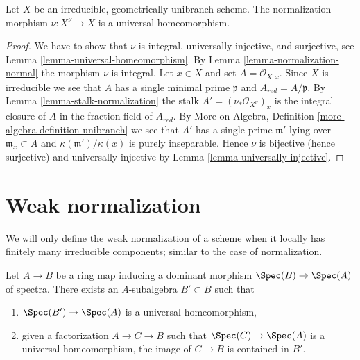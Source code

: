 \begin{lemma}
\label{lemma-normalization-geom-unibranch-univ-homeo}
Let $X$ be an irreducible, geometrically unibranch scheme.
The normalization morphism $\nu : X^\nu \to X$ is a universal
homeomorphism.
\end{lemma}

\begin{proof}
We have to show that $\nu$ is integral, universally injective,
and surjective, see Lemma \ref{lemma-universal-homeomorphism}.
By Lemma \ref{lemma-normalization-normal} the morphism $\nu$
is integral. Let $x \in X$ and set $A = \mathcal{O}_{X, x}$.
Since $X$ is irreducible we see that $A$ has a single
minimal prime $\mathfrak p$ and $A_{red} = A/\mathfrak p$.
By Lemma \ref{lemma-stalk-normalization} the stalk
$A' = (\nu_*\mathcal{O}_{X^\nu})_x$ is the integral closure of
$A$ in the fraction field of $A_{red}$. By
More on Algebra, Definition \ref{more-algebra-definition-unibranch}
we see that $A'$ has a single prime $\mathfrak m'$ lying
over $\mathfrak m_x \subset A$ and $\kappa(\mathfrak m')/\kappa(x)$
is purely inseparable. Hence $\nu$ is bijective (hence surjective)
and universally injective by Lemma \ref{lemma-universally-injective}.
\end{proof}







\section{Weak normalization}
\label{section-weak-normalization}

\noindent
We will only define the weak normalization of a scheme when
it locally has finitely many irreducible components; similar
to the case of normalization.

\begin{lemma}
\label{lemma-relative-weak-normalization-algebra}
Let $A \to B$ be a ring map inducing a dominant morphism
$\Spec(B) \to \Spec(A)$ of spectra. There exists an $A$-subalgebra
$B' \subset B$ such that
\begin{enumerate}
\item $\Spec(B') \to \Spec(A)$ is a universal homeomorphism,
\item given a factorization $A \to C \to B$ such that
$\Spec(C) \to \Spec(A)$ is a universal homeomorphism, the
image of $C \to B$ is contained in $B'$.
\end{enumerate}
\end{lemma}

